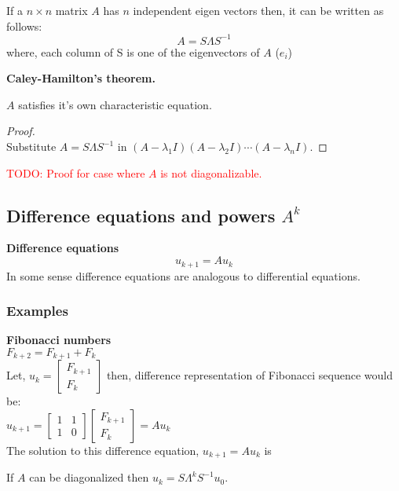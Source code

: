 If a $n \times n$ matrix $A$ has $n$ independent eigen vectors then, it can be written as follows: 
$$A = S\Lambda S^{-1} $$ 
where, each column of S is one of the eigenvectors of $A$ ($e_i$)\\

\begin{mdframed}[backgroundcolor=blue!10,linecolor=blue]
\begin{center}
\textbf{Caley-Hamilton's theorem.}	
\end{center}
\begin{theorem}[]
$A$ satisfies it's own characteristic equation.
\begin{proof}
\hspace{5pt}\\
Substitute $A = S\Lambda S^{-1}$ in $(A -\lambda_1 I)(A - \lambda_2 I)\cdots(A - \lambda_n I)$.
\end{proof}
\end{theorem}
\end{mdframed}
\textcolor{red}{TODO: Proof for case where $A$ is not diagonalizable.}



\subsection{Difference equations and powers $A^k$}
\textbf{Difference equations}
$$u_{k+1} = Au_k$$
In some sense difference equations are analogous to differential equations.

\subsubsection{Examples}

\textbf{Fibonacci numbers}\\

$F_{k+2} = F_{k+1} + F_k$\\

Let, 
$
u_k = 
\begin{bmatrix}
F_{k+1}\\
F_k
\end{bmatrix}
$
then, difference representation of Fibonacci sequence would be:\\
$
u_{k+1} = 
\begin{bmatrix}
1 & 1 \\
1 & 0
\end{bmatrix}
\begin{bmatrix}
F_{k+1}\\
F_k	
\end{bmatrix}
= Au_k
$\\
The solution to this difference equation, $u_{k+1} = Au_k$ is \\
\begin{center}
\end{center}
If $A$ can be diagonalized then $u_k = S\Lambda^kS^{-1}u_0$. \\

